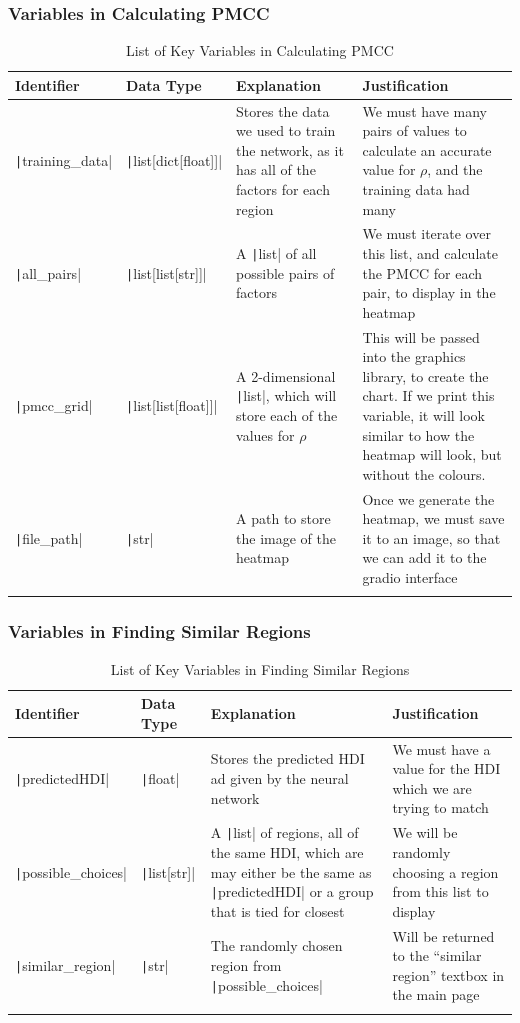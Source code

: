 \documentclass[12pt]{report}
\newcommand{\pil}[1]{\protect\texttt|#1|}
\begin{document}
\subsubsection{Variables in Calculating PMCC}
\begin{center}
\begin{longtable}{ | m{3cm} | m{4cm}| m{4cm} | m{4cm} |} 
    \hline
    \textbf{Identifier} & \textbf{Data Type} & \textbf{Explanation}  & \textbf{Justification} \\ 
    \hline
    \pil{training_data} & \pil{list[dict[float]]} & Stores the data we used to train the network, as it has all of the factors for each region & We must have many pairs of values to calculate an accurate value for $\rho$, and the training data had many \\ 
    \hline
    \pil{all_pairs} & \pil{list[list[str]]} & A \pil{list} of all possible pairs of factors & We must iterate over this list, and calculate the PMCC for each pair, to display in the heatmap \\ 
    \hline
    \pil{pmcc_grid} & \pil{list[list[float]]} & A 2-dimensional \pil{list}, which will store each of the values for $\rho$ & This will be passed into the graphics library, to create the chart. If we print this variable, it will look similar to how the heatmap will look, but without the colours. \\ 
    \hline
    \pil{file_path} & \pil{str} & A path to store the image of the heatmap & Once we generate the heatmap, we must save it to an image, so that we can add it to the gradio interface \\ 
    \hline
\caption{List of Key Variables in Calculating PMCC}
\end{longtable}
\end{center}

\subsubsection{Variables in Finding Similar Regions}
\begin{center}
\begin{longtable}{ | m{3cm} | m{4cm}| m{4cm} | m{4cm} |} 
    \hline
    \textbf{Identifier} & \textbf{Data Type} & \textbf{Explanation}  & \textbf{Justification} \\ 
    \hline
    \pil{predictedHDI} & \pil{float} & Stores the predicted HDI ad given by the neural network & We must have a value for the HDI which we are trying to match \\ 
    \hline
    \pil{possible_choices} & \pil{list[str]} & A \pil{list} of regions, all of the same HDI, which are may either be the same as \pil{predictedHDI} or a group that is tied for closest & We will be randomly choosing a region from this list to display \\ 
    \hline
    \pil{similar_region} & \pil{str} & The randomly chosen region from \pil{possible_choices} & Will be returned to the ``similar region'' textbox in the main page \\ 
    \hline
\caption{List of Key Variables in Finding Similar Regions}
\end{longtable}
\end{center}
\end{document}
